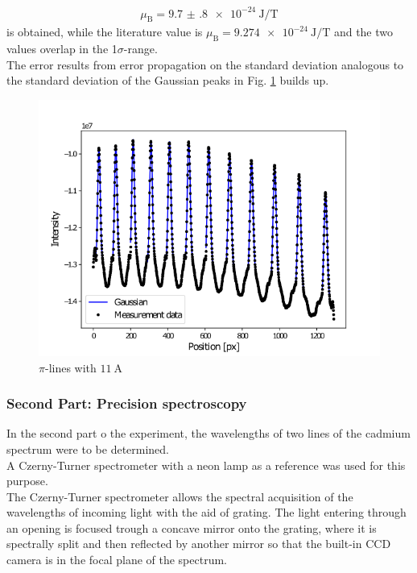 \begin{align*}
\mu_\text{B}=\SI{9.7(8)e-24}{\joule\per\tesla}
\end{align*}
is obtained, while the literature value is $\mu_\text{B}=\SI{9.274e-24}{\joule\per\tesla}$ and the two values overlap in the 1$\sigma$-range.\\
The error results from error propagation on the standard deviation analogous to the standard deviation of the Gaussian peaks in Fig. \ref{fig:gaussian} builds up.
\begin{figure}[ht]
\centering
\includegraphics[scale=.55]{images//gaussian.png}
\caption{$\pi$-lines with $\SI{11}{\ampere}$}
\label{fig:gaussian}
\end{figure}

\subsubsection{Second Part: Precision spectroscopy}
In the second part o the experiment, the wavelengths of two lines of the cadmium spectrum were to be determined.\\

A Czerny-Turner spectrometer with a neon lamp as a reference was used for this purpose.\\
The Czerny-Turner spectrometer allows the spectral acquisition of the wavelengths of incoming light with the aid of grating.
The light entering through an opening is focused trough a concave mirror onto the grating, where it is spectrally split and then reflected by another mirror so that the built-in CCD camera is in the focal plane of the spectrum.\\

